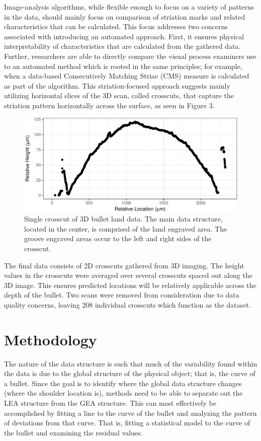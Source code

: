 \documentclass[12pt]{article}
\begin{document}
Image-analysis algorithms, while flexible enough to focus on a variety
of patterns in the data, should mainly focus on comparison of striation
marks and related characteristics that can be calculated. This focus
addresses two concerns associated with introducing an automated
approach. First, it ensures physical interpretability of characteristics
that are calculated from the gathered data. Further, researchers are
able to directly compare the visual process examiners use to an
automated method which is rooted in the same principles; for example,
when a data-based Consecutively Matching Striae (CMS) measure is
calculated as part of the algorithm. This striation-focused approach
suggests mainly utilizing horizontal slices of the 3D scan, called
crosscuts, that capture the striation pattern horizontally across the
surface, as seen in Figure 3.

\begin{figure}[htbp]
\centering
\includegraphics{writeup_files/figure-latex/unnamed-chunk-2-1.pdf}
\caption{Single crosscut of 3D bullet land data. The main data
structure, located in the center, is comprised of the land engraved
area. The groove engraved areas occur to the left and right sides of the
crosscut.}
\end{figure}

The final data consists of 2D crosscuts gathered from 3D imaging. The
height values in the crosscuts were averaged over several crosscuts
spaced out along the 3D image. This ensures predicted locations will be
relatively applicable across the depth of the bullet. Two scans were
removed from consideration due to data quality concerns, leaving 208
individual crosscuts which function as the dataset.

\section{Methodology}

The nature of the data structure is such that much of the variability
found within the data is due to the global structure of the physical
object; that is, the curve of a bullet. Since the goal is to identify
where the global data structure changes (where the shoulder location
is), methods need to be able to separate out the LEA structure from the
GEA structure. This can most effectively be accomplished by fitting a
line to the curve of the bullet and analyzing the pattern of deviations
from that curve. That is, fitting a statistical model to the curve of
the bullet and examining the residual values.
\end{document}
